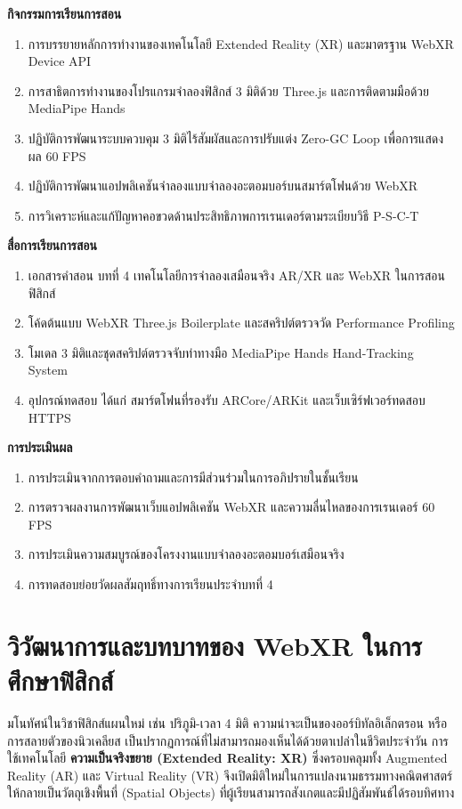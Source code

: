\noindent\textbf{กิจกรรมการเรียนการสอน}
\begin{enumerate}
    \item การบรรยายหลักการทำงานของเทคโนโลยี Extended Reality (XR) และมาตรฐาน WebXR Device API
    \item การสาธิตการทำงานของโปรแกรมจำลองฟิสิกส์ 3 มิติด้วย Three.js และการติดตามมือด้วย MediaPipe Hands
    \item ปฏิบัติการพัฒนาระบบควบคุม 3 มิติไร้สัมผัสและการปรับแต่ง Zero-GC Loop เพื่อการแสดงผล 60 FPS
    \item ปฏิบัติการพัฒนาแอปพลิเคชันจำลองแบบจำลองอะตอมบอร์บนสมาร์ตโฟนด้วย WebXR
    \item การวิเคราะห์และแก้ปัญหาคอขวดด้านประสิทธิภาพการเรนเดอร์ตามระเบียบวิธี P-S-C-T
\end{enumerate}

\noindent\textbf{สื่อการเรียนการสอน}
\begin{enumerate}
    \item เอกสารคำสอน บทที่ 4 เทคโนโลยีการจำลองเสมือนจริง AR/XR และ WebXR ในการสอนฟิสิกส์
    \item โค้ดต้นแบบ WebXR Three.js Boilerplate และสคริปต์ตรวจวัด Performance Profiling
    \item โมเดล 3 มิติและชุดสคริปต์ตรวจจับท่าทางมือ MediaPipe Hands Hand-Tracking System
    \item อุปกรณ์ทดสอบ ได้แก่ สมาร์ตโฟนที่รองรับ ARCore/ARKit และเว็บเซิร์ฟเวอร์ทดสอบ HTTPS
\end{enumerate}

\noindent\textbf{การประเมินผล}
\begin{enumerate}
    \item การประเมินจากการตอบคำถามและการมีส่วนร่วมในการอภิปรายในชั้นเรียน
    \item การตรวจผลงานการพัฒนาเว็บแอปพลิเคชัน WebXR และความลื่นไหลของการเรนเดอร์ 60 FPS
    \item การประเมินความสมบูรณ์ของโครงงานแบบจำลองอะตอมบอร์เสมือนจริง
    \item การทดสอบย่อยวัดผลสัมฤทธิ์ทางการเรียนประจำบทที่ 4
\end{enumerate}

\newpage

\section{วิวัฒนาการและบทบาทของ WebXR ในการศึกษาฟิสิกส์}

มโนทัศน์ในวิชาฟิสิกส์แผนใหม่ เช่น ปริภูมิ-เวลา 4 มิติ ความน่าจะเป็นของออร์บิทัลอิเล็กตรอน หรือการสลายตัวของนิวเคลียส เป็นปรากฏการณ์ที่ไม่สามารถมองเห็นได้ด้วยตาเปล่าในชีวิตประจำวัน การใช้เทคโนโลยี \textbf{ความเป็นจริงขยาย (Extended Reality: XR)} ซึ่งครอบคลุมทั้ง Augmented Reality (AR) และ Virtual Reality (VR) จึงเปิดมิติใหม่ในการแปลงนามธรรมทางคณิตศาสตร์ให้กลายเป็นวัตถุเชิงพื้นที่ (Spatial Objects) ที่ผู้เรียนสามารถสังเกตและมีปฏิสัมพันธ์ได้รอบทิศทาง

